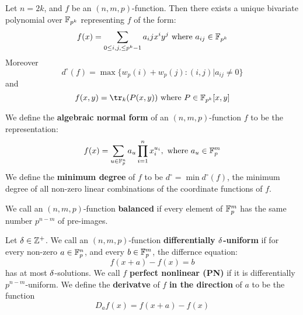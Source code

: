 \begin{lemma}\label{1.1.3}
  Let $n=2k$, and $f$ be an $(n,m,p)$-function. Then there exists a
  unique bivariate polynomial over $\mathbb{F}_{p^k}$ representing $f$ of the
  form:
  \begin{equation}\label{equation_1.6}
    f(x)=\sum_{0 \leq i,j, \leq p^k-1}{a_ijx^iy^j} \text{ where } a_{ij} \in
    \mathbb{F}_{p^k}
  \end{equation}
  Moreover
  \begin{equation*}
    d^\circ(f)=\max{\{w_p(i)+w_p(j) : (i,j)|a_{ij} \neq 0\}}
  \end{equation*}
  and
  \begin{equation*}
    f(x,y)=\tr_k(P(x,y)) \text{ where } P \in \F_{p^k}[x,y]
  \end{equation*}
\end{lemma}

\begin{definition}
  We define the \textbf{algebraic normal form} of an $(n,m,p)$-function
  $f$ to be the representation:
  \begin{equation}\label{equation_1.7}
    f(x)=\sum_{u \in \mathbb{F}_p^n}{a_u\prod_{i=1}^nx_i^{u_i}}, \text{ where }
    a_u \in \mathbb{F}_p^m
  \end{equation}
  We define the \textbf{minimum degree} of $f$ to be
  $d^\circ=\min{d^\circ(f)}$, the minimum degree of all non-zero
  linear combinations of the coordinate functions of $f$.
\end{definition}

\begin{definition}
  We call an $(n,m,p)$-function \textbf{balanced} if every element of
  $\mathbb{F}_p^m$ has the same number $p^{n-m}$ of pre-images.
\end{definition}

\begin{defition}
  Let $\delta \in \mathbb{Z}^+$. We call an $(n,m,p)$-function
  \textbf{differentially $\delta$-uniform} if for every non-zero $a \in
  \mathbb{F}_p^n$, and every $b \in \mathbb{F}_p^m$, the differnce equation:
  \begin{equation}\label{equation_1.8}
    f(x+a)-f(x)=b
  \end{equation}
  has at most $\delta$-solutions. We call $f$ \textbf{perfect nonlinear
  (PN)} if it is differentially $p^{n-m}$-uniform. We define the
  \textbf{derivatve} of $f$ \textbf{in the direction} of $a$ to be
  the function
  \begin{equation*}
    D_a{f(x)}=f(x+a)-f(x)
  \end{equation*}
\end{defition}

